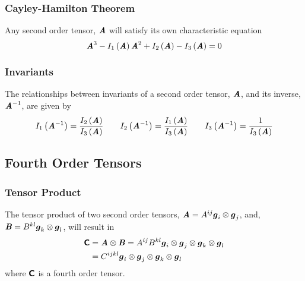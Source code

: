 \subsubsection{Cayley-Hamilton Theorem}
\label{subsubsec:CayleyHamiltonTheorem}

Any second order tensor, $\boldsymbol{\mathit{A}}$ will satisfy its own characteristic equation \ie
\begin{equation}
  \tensor{A}^{3}-\fnof{I_{1}}{\tensor{A}}\tensor{A}^{2}+\fnof{I_{2}}{\tensor{A}}-\fnof{I_{3}}{\tensor{A}}=0
  \label{eqn:CharacteristicEquationSecondOrder}
\end{equation}

\subsubsection{Invariants}
\label{subsubsec:InvariantsSecondOrder}

The relationships between invariants of a second order tensor, $\boldsymbol{\mathit{A}}$,
and its inverse, ${\boldsymbol{\mathit{A}}}^{-1}$, are given by
\begin{equation}
   I_1\left( {\boldsymbol{\mathit{A}}}^{-1} \right) =\dfrac{ I_{2}\left( \boldsymbol{\mathit{A}} \right) }{ I_{3}\left( \boldsymbol{\mathit{A}} \right) }\quad\quad
   I_2\left( {\boldsymbol{\mathit{A}}}^{-1} \right) =\dfrac{ I_{1}\left( \boldsymbol{\mathit{A}} \right) }{ I_{3}\left( \boldsymbol{\mathit{A}} \right) }\quad\quad
   I_3\left( {\boldsymbol{\mathit{A}}}^{-1} \right) =\dfrac{1}{ I_{3}\left( \boldsymbol{\mathit{A}} \right) }
\end{equation}

\subsection{Fourth Order Tensors}
\label{subsec:TensorAlgebraFourthOrder}


\subsubsection{Tensor Product}
\label{subsubsec:TensorProductFourthOrder}

The tensor product of two second order tensors, $\boldsymbol{\mathit{A}}=A^{ij} \boldsymbol{g}_{i} \otimes \boldsymbol{g}_{j} $, and,
$\boldsymbol{\mathit{B}}=B^{kl} \boldsymbol{g}_{k} \otimes \boldsymbol{g}_{l} $, will result in
\begin{equation}
  \begin{aligned}
    \boldsymbol{\mathsf{C}}&= \boldsymbol{\mathit{A}} \otimes \boldsymbol{\mathit{B}} =A^{ij}B^{kl} \boldsymbol{g}_{i} \otimes \boldsymbol{g}_{j} \otimes \boldsymbol{g}_{k} \otimes \boldsymbol{g}_{l} \\
    &=C^{ijkl} \boldsymbol{g}_{i} \otimes \boldsymbol{g}_{j} \otimes \boldsymbol{g}_{k} \otimes \boldsymbol{g}_{l} 
  \end{aligned}
\end{equation}
where $\boldsymbol{\mathsf{C}}$ is a fourth order tensor.

